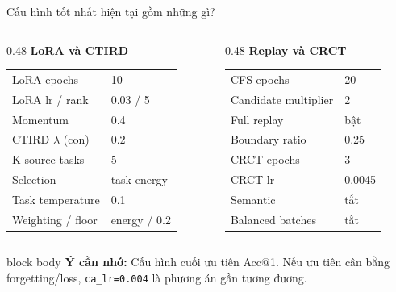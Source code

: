 \documentclass[aspectratio=169,11pt]{beamer}
\newcommand{\remember}[1]{%
  \vfill
  \begin{beamercolorbox}[wd=\textwidth,sep=0.22cm,rounded=true]{block body}
    \textbf{Ý cần nhớ:} #1
  \end{beamercolorbox}
}
\begin{document}
\begin{frame}{Cấu hình tốt nhất hiện tại gồm những gì?}
  \small
  \begin{columns}[T,onlytextwidth]
    \begin{column}{0.48\textwidth}
      {\large\bfseries LoRA và CTIRD}\par\vspace{0.18cm}
      \begin{tabular}{ll}
        LoRA epochs & 10 \\
        LoRA lr / rank & 0.03 / 5 \\
        Momentum & 0.4 \\
        CTIRD $\lambda$ (con) & 0.2 \\
        K source tasks & 5 \\
        Selection & task energy \\
        Task temperature & 0.1 \\
        Weighting / floor & energy / 0.2 \\
      \end{tabular}
    \end{column}
    \begin{column}{0.48\textwidth}
      {\large\bfseries Replay và CRCT}\par\vspace{0.18cm}
      \begin{tabular}{ll}
        CFS epochs & 20 \\
        Candidate multiplier & 2 \\
        Full replay & bật \\
        Boundary ratio & 0.25 \\
        CRCT epochs & 3 \\
        CRCT lr & 0.0045 \\
        Semantic & tắt \\
        Balanced batches & tắt \\
      \end{tabular}
    \end{column}
  \end{columns}
  \remember{Cấu hình cuối ưu tiên Acc@1. Nếu ưu tiên cân bằng forgetting/loss, \texttt{ca\_lr=0.004} là phương án gần tương đương.}
\end{frame}
\end{document}
